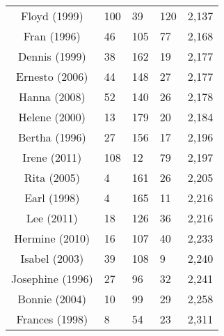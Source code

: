 \begin{table}[ht]
\begin{tabular}{cP{3cm}P{3cm}P{3cm}P{3cm}}
  Floyd (1999) & 100 & 39 & 120 & 2,137 \\ 
  Fran (1996) & 46 & 105 & 77 & 2,168 \\ 
  Dennis (1999) & 38 & 162 & 19 & 2,177 \\ 
  Ernesto (2006) & 44 & 148 & 27 & 2,177 \\ 
  Hanna (2008) & 52 & 140 & 26 & 2,178 \\ 
  Helene (2000) & 13 & 179 & 20 & 2,184 \\ 
  Bertha (1996) & 27 & 156 & 17 & 2,196 \\ 
  Irene (2011) & 108 & 12 & 79 & 2,197 \\ 
  Rita (2005) & 4 & 161 & 26 & 2,205 \\ 
  Earl (1998) & 4 & 165 & 11 & 2,216 \\ 
  Lee (2011) & 18 & 126 & 36 & 2,216 \\ 
  Hermine (2010) & 16 & 107 & 40 & 2,233 \\ 
  Isabel (2003) & 39 & 108 & 9 & 2,240 \\ 
  Josephine (1996) & 27 & 96 & 32 & 2,241 \\ 
  Bonnie (2004) & 10 & 99 & 29 & 2,258 \\ 
  Frances (1998) & 8 & 54 & 23 & 2,311 \\ 
   \bottomrule
\end{tabular}
\end{table}
